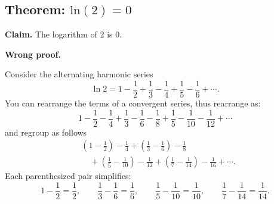 \documentclass[11pt]{article}
\begin{document}















\subsection{Theorem: $\text{ln}(2) = 0$}

\textbf{Claim.} The logarithm of 2 is 0.

\textbf{Wrong proof.}

Consider the alternating harmonic series
\[
\ln2 = 1-\frac12+\frac13-\frac14+\frac15-\frac16+\cdots.
\]
You can rearrange the terms of a convergent series, thus rearrange as:
\[
1-\frac12-\frac14+\frac13-\frac16-\frac18+\frac15-\frac1{10}-\frac1{12}
+\cdots
\]
and regroup as follows
\[
\begin{aligned}
&\left(1-\frac{1}{2}\right)-\frac{1}{4}
+\left(\frac{1}{3}-\frac{1}{6}\right)-\frac{1}{8} \\
&\quad+\left(\frac{1}{5}-\frac{1}{10}\right)-\frac{1}{12}
+\left(\frac{1}{7}-\frac{1}{14}\right)-\frac{1}{16}
+\cdots.
\end{aligned}
\]
Each parenthesized pair simplifies:
\[
1-\frac12=\frac12,\qquad
\frac13-\frac16=\frac16,\qquad
\frac15-\frac1{10}=\frac1{10},\qquad
\frac17-\frac1{14}=\frac1{14}.
\]
\end{document}
